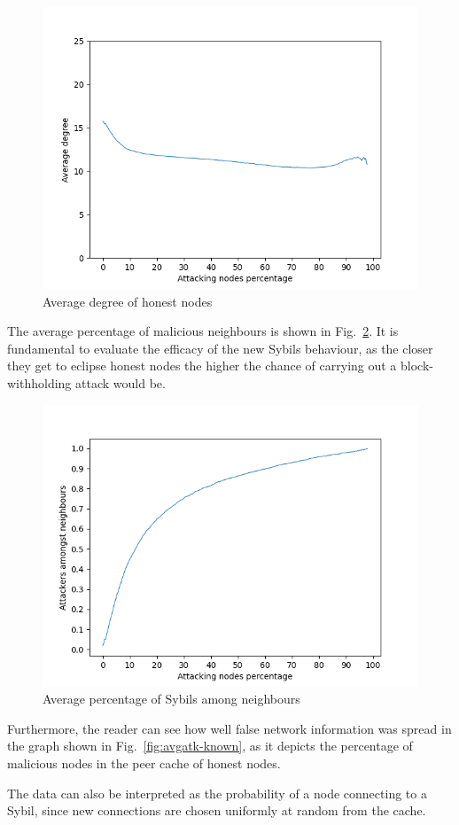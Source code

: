 \begin{figure}[h!]
	\includegraphics[width=.7\textwidth]{pict/results/in-hon-avg-neigh.png}
	\centering
	\caption{Average degree of honest nodes}
	\label{fig:degreehon}
\end{figure}

The average percentage of malicious neighbours is shown in Fig.~\ref{fig:avgatk}. It is fundamental to evaluate the efficacy of the new Sybils behaviour, as the closer they get to eclipse honest nodes the higher the chance of carrying out a block-withholding attack would be.\\

\begin{figure}[h!]
	\includegraphics[width=.7\textwidth]{pict/results/in-hon-avg-neigh-atk.png}
	\centering
	\caption{Average percentage of Sybils among neighbours}
	\label{fig:avgatk}
\end{figure}

Furthermore, the reader can see how well false network information was spread in the graph shown in Fig.~\ref{fig:avgatk-known}, as it depicts the percentage of malicious nodes in the peer cache of honest nodes.

The data can also be interpreted as the probability of a node connecting to a Sybil, since new connections are chosen uniformly at random from the cache.\\


